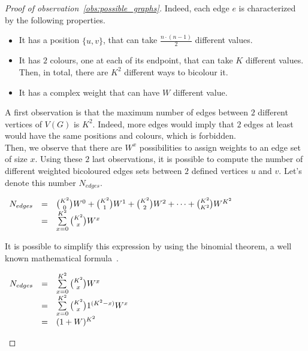 \begin{proof}[Proof of observation~\ref{obs:possible_graphs}]
    Indeed, each edge $e$ is characterized by the following properties.
    \begin{itemize}
        \item It has a position $\{u, v\}$, that can take $\frac{n \cdot (n -1)}{2}$ different values.
        \item It has $2$ colours, one at each of its endpoint, that can take $K$ different values.
            Then, in total, there are $K^2$ different ways to bicolour it.
        \item It has a complex weight that can have $W$ different value.
    \end{itemize}

    A first observation is that the maximum number of edges between $2$ different vertices of $V(G)$ is $K^2$.
    Indeed, more edges would imply that $2$ edges at least would have the same positions and colours, which is forbidden.\\

    Then, we observe that there are $W^x$ possibilities to assign weights to an edge set of size $x$.
    Using these $2$ last observations, it is possible to compute the number of different weighted bicoloured edges sets between $2$ defined vertices $u$ and $v$.
    Let's denote this number $N_{edges}$.

    \begin{center}
        $\begin{array}{r c l}
             N_{edges} & = & {K^2 \choose 0} W^0 + {K^2 \choose 1} W^1 + {K^2 \choose 2} W^2 + \cdots + {K^2 \choose K^2} W^{K^2} \\
                       & = & \sum\limits_{x=0}^{K^2} {K^2 \choose x} W^x
        \end{array}$
    \end{center}

    It is possible to simplify this expression by using the binomial theorem, a well known mathematical formula~\cite{binomialTheorem}.

    \begin{center}
        $\begin{array}{r c l}
             N_{edges} & = & \sum\limits_{x=0}^{K^2} {K^2 \choose x} W^x               \\
                       & = & \sum\limits_{x=0}^{K^2} {K^2 \choose x} 1^{(K^2 - x)} W^x \\
                       & = & (1 + W)^{K^2}
        \end{array}$
    \end{center}


\end{proof}
